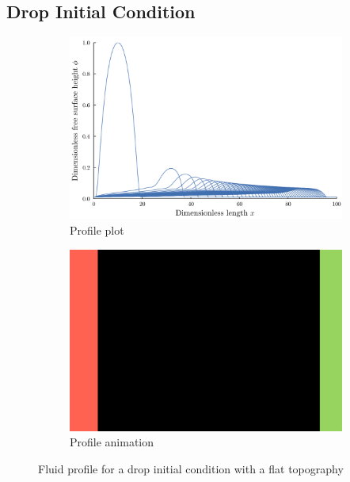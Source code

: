 \subsection{Drop Initial Condition}
\begin{frame}
    \begin{figure}
        \centering
        \begin{subfigure}[ht]{.5\textwidth}
            \includegraphics[width=\textwidth]{images/flat/plt_notitle.png}
            \caption{Profile plot}
            \label{fig:drop_flat_profile}
        \end{subfigure}%
        \begin{subfigure}[ht]{.5\textwidth}
            \includegraphics[width=\textwidth]{images/placeholder.png}
            \caption{Profile animation}
            \label{fig:drop_flat_anim}
        \end{subfigure}
        \caption{Fluid profile for a drop initial condition with a flat topography} 
    \end{figure}
\end{frame} 
